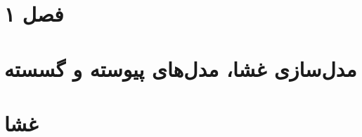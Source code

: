 \documentclass[a4paper,12pt]{book}
\begin{document}
\cleardoublepage
{} 







\tableofcontents
\clearpage
\listoffigures

\def \Mempath {Chapters/Membrane}


\clearpage
\chapter{فصل ۱}

\clearpage
\chapter{
مدل‌سازی غشا، مدل‌های پیوسته و گسسته
}


\clearpage
\chapter{
 غشا
}


\unsetRL
 



\end{document}
